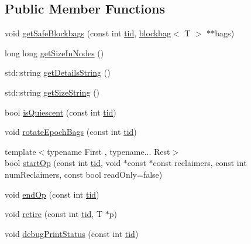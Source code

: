 \subsection*{Public Member Functions}
\begin{DoxyCompactItemize}
\item 
void \hyperlink{classreclaimer__debracap_a4682c2d23e5b59f4e4e036865e903b3b}{get\+Safe\+Blockbags} (const int \hyperlink{microbench_2main_8cpp_a9ca9869868fe7e7a38a921cc7de4103f}{tid}, \hyperlink{classblockbag}{blockbag}$<$ T $>$ $\ast$$\ast$bags)
\item 
long long \hyperlink{classreclaimer__debracap_a2315cce188568d1b2e7b5809a943b7a6}{get\+Size\+In\+Nodes} ()
\item 
std\+::string \hyperlink{classreclaimer__debracap_ad005056c2b7740bb2172efeae2369434}{get\+Details\+String} ()
\item 
std\+::string \hyperlink{classreclaimer__debracap_adb2070ff175d8131d7da92820c5d2de7}{get\+Size\+String} ()
\item 
bool \hyperlink{classreclaimer__debracap_a7d248af33f59e0154df2bf21f7889bc8}{is\+Quiescent} (const int \hyperlink{microbench_2main_8cpp_a9ca9869868fe7e7a38a921cc7de4103f}{tid})
\item 
void \hyperlink{classreclaimer__debracap_a5304ffe3a8227e5b77275ded7a742d5d}{rotate\+Epoch\+Bags} (const int \hyperlink{microbench_2main_8cpp_a9ca9869868fe7e7a38a921cc7de4103f}{tid})
\item 
{\footnotesize template$<$typename First , typename... Rest$>$ }\\bool \hyperlink{classreclaimer__debracap_a2052d4c9d165157e85c75230a3a8e584}{start\+Op} (const int \hyperlink{microbench_2main_8cpp_a9ca9869868fe7e7a38a921cc7de4103f}{tid}, void $\ast$const $\ast$const reclaimers, const int num\+Reclaimers, const bool read\+Only=false)
\item 
void \hyperlink{classreclaimer__debracap_af290e3cb806e6b4a7325defc2311ad62}{end\+Op} (const int \hyperlink{microbench_2main_8cpp_a9ca9869868fe7e7a38a921cc7de4103f}{tid})
\item 
void \hyperlink{classreclaimer__debracap_acfe29401909be4a5a34bf4ba4978d90b}{retire} (const int \hyperlink{microbench_2main_8cpp_a9ca9869868fe7e7a38a921cc7de4103f}{tid}, T $\ast$p)
\item 
void \hyperlink{classreclaimer__debracap_a42e33db09c07092c58669f718a6d6776}{debug\+Print\+Status} (const int \hyperlink{microbench_2main_8cpp_a9ca9869868fe7e7a38a921cc7de4103f}{tid})
\item 
$$
\end{DoxyCompactItemize}
